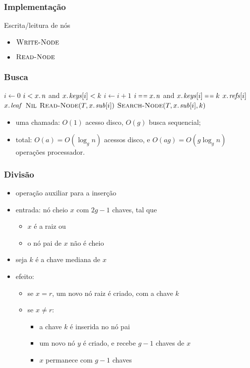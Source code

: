 \documentclass{beamer}
\begin{document}
\begin{frame}
\frametitle{Implementação}

Escrita/leitura de nós
\begin{itemize}
  \item $\textnormal{\scshape Write-Node}$
  \item $\textnormal{\scshape Read-Node}$
\end{itemize}

\end{frame}

\begin{frame}
\frametitle{Busca}

\begin{codebox}
\li $i \gets 0$
\li \While $i < \attrib{x}{n}$ and $\attrib{x}{keys}[i] < k$
\li \Do $i \gets i + 1$
    \End
\li \If $i \isequal \attrib{x}{n}$ and $\attrib{x}{keys}[i] \isequal k$
\li \Then \Return $\attrib{x}{refs}[i]$
    \End
\li \If $\attrib{x}{leaf}$
\li \Then \Return $\textnormal{\scshape Nil}$
    \End
\li $\proc{Read-Node}(T, \attrib{x}{sub}[i])$
\li \Return $\proc{Search-Node}(T, \attrib{x}{sub}[i], k)$
\end{codebox}

\pause
\begin{itemize}
\item uma chamada: $O(1)$ acesso disco, $O(g)$ busca sequencial;
\item total: $O(a) = O(\log_{g} n)$ acessos disco, e $O(ag) = O(g\log_g n)$ 
operações processador.
\end{itemize}
\end{frame}

\begin{frame}
\frametitle{Divisão}

\begin{itemize}
\item operação auxiliar para a inserção
\item entrada: nó cheio $x$ com $2g-1$ chaves, tal que 
  \begin{itemize}
    \item $x$ é a raiz ou
    \item o nó pai de $x$ não é cheio
  \end{itemize}
\item seja $k$ é a chave mediana de $x$
\item efeito:
  \begin{itemize}
    \item se $x = r$, um novo nó raiz é criado, com a chave $k$
    \item se $x \neq r$:
      \begin{itemize}
        \item a chave $k$ é inserida no nó pai
        \item um novo nó $y$ é criado, e recebe $g-1$ chaves de $x$
        \item $x$ permanece com $g-1$ chaves
      \end{itemize}
  \end{itemize}
\end{itemize}

\end{frame}
\end{document}
